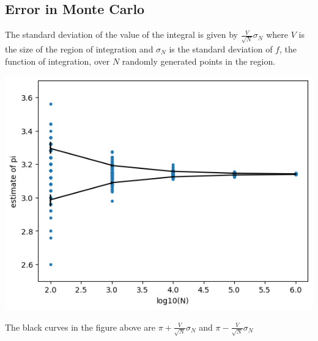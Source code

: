 \documentclass[12pt,letterpaper,noanswers]{exam}
\begin{document}

\subsection*{Error in Monte Carlo}

The standard deviation of the value of the integral is given by $\frac{V}{\sqrt{N}}\sigma_N$ where $V$ is the size of the region of integration and $\sigma_N$ is the standard deviation of $f$, the function of integration, over $N$ randomly generated points in the region.



\includegraphics[width=0.5\linewidth]{img/C17piest.png}

The black curves in the figure above are $\pi + \frac{V}{\sqrt{N}}\sigma_N$ and $\pi - \frac{V}{\sqrt{N}}\sigma_N$

\vspace{0.1cm}

    
    
    

    




\end{document}
